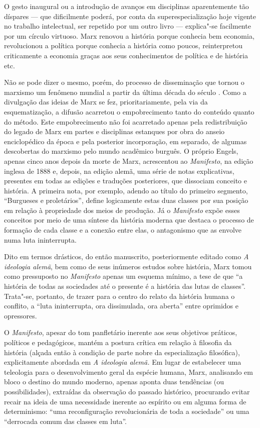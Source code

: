 O gesto inaugural ou a introdução de avanços em disciplinas
aparentemente tão díspares --- que dificilmente poderá, por conta da
superespecialização hoje vigente no trabalho intelectual, ser repetido
por um outro livro --- explica"-se facilmente por um círculo virtuoso.
Marx renovou a história porque conhecia bem economia, revolucionou a
política porque conhecia a história como poucos, reinterpretou
criticamente a economia graças aos seus conhecimentos de política e de
história etc.

Não se pode dizer o mesmo, porém, do processo de disseminação que tornou
o marxismo um fenômeno mundial a partir da última década do século .
Como a divulgação das ideias de Marx se fez, prioritariamente, pela via da
esquematização, a difusão acarretou o empobrecimento tanto do conteúdo
quanto do método. Este empobrecimento não foi acarretado apenas pela
redistribuição do legado de Marx em partes e disciplinas estanques por
obra do anseio enciclopédico da época e pela posterior incorporação, em
separado, de algumas descobertas do marxismo pelo mundo acadêmico
burguês. O próprio Engels, apenas cinco anos depois da morte de Marx,
acrescentou ao \textit{Manifesto}, na edição inglesa de 1888 e, depois,
na edição alemã, uma série de notas explicativas, presentes em todas as
edições e traduções posteriores, que dissociam conceito e história. A
primeira nota, por exemplo, adendo ao título do primeiro segmento,
“Burgueses e proletários”, define logicamente estas duas classes por
sua posição em relação à propriedade dos meios de produção. Já o
\textit{Manifesto} expõe esses conceitos por meio de uma síntese da
história moderna que destaca o processo de formação de cada classe e a
conexão entre elas, o antagonismo que as envolve numa luta
ininterrupta.

Dito em termos drásticos, do então manuscrito, posteriormente editado
como \textit{A ideologia alemã}, bem como de seus inúmeros estudos
sobre história, Marx tomou como pressuposto no \textit{Manifesto}
apenas um esquema mínimo, a tese de que “a história de todas as
sociedades até o presente é a história das lutas de classes”.
Trata"-se, portanto, de trazer para o centro do relato da história
humana o conflito, a “luta ininterrupta, ora dissimulada, ora aberta”
entre oprimidos e opressores.

O \textit{Manifesto}, apesar do tom panfletário inerente aos seus
objetivos práticos, políticos e pedagógicos, mantém a postura crítica
em relação à filosofia da história (alçada então à condição de parte
nobre da especialização filosófica), explicitamente abordada em
\textit{A ideologia alemã.} Em lugar de estabelecer uma teleologia para
o desenvolvimento geral da espécie humana, Marx, analisando em bloco o
destino do mundo moderno, apenas aponta duas tendências (ou
possibilidades), extraídas da observação do passado histórico,
procurando evitar recair na ideia de uma necessidade inerente ao
espírito ou em alguma forma de determinismo: “uma reconfiguração
revolucionária de toda a sociedade” ou uma “derrocada comum das classes
em luta”.

